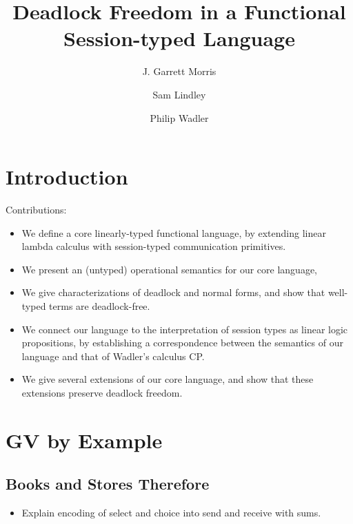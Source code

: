 \documentclass[orivec,envcountsame]{llncs}
\title{Deadlock Freedom in a Functional Session-typed Language}
\author{J. Garrett Morris \and Sam Lindley \and Philip Wadler}
\institute{The University of Edinburgh \\
           \email{\{Garrett.Morris,Sam.Lindley,Philip.Wadler\}@ed.ac.uk} \vspace{-5mm}}
\begin{document}
\maketitle

\begin{abstract}
\end{abstract}

\section{Introduction}\label{sec:intro}

Contributions:

\begin{itemize}
\item We define a core linearly-typed functional language, by extending linear lambda calculus
  with session-typed communication primitives.
\item We present an (untyped) operational semantics for our core language,
\item We give characterizations of deadlock and normal forms, and show that well-typed terms are
  deadlock-free.
\item We connect our language to the interpretation of session types as linear logic propositions,
  by establishing a correspondence between the semantics of our language and that of Wadler's
  calculus CP.
\item We give several extensions of our core language, and show that these extensions preserve
  deadlock freedom.
\end{itemize}

\section{GV by Example}\label{sec:examples}

\subsection{Books and Stores Therefore}

\begin{itemize}
\item Explain encoding of select and choice into send and receive with sums.
\end{itemize}

\end{document}
